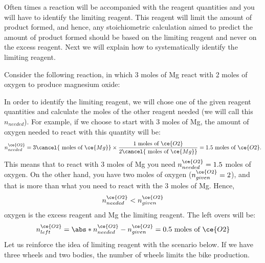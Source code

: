 \documentclass[main.tex]{subfiles}
\begin{document}
\begin{description}
Often times a reaction will be accompanied with the reagent quantities and you will have to identify the limiting reagent. This reagent will limit the amount of product formed, and hence, any stoichiometric calculation aimed to predict the amount of product formed should be based on the limiting reagent and never on the excess reagent.  Next we will explain how to systematically identify the limiting reagent.
\item[\docfilehook{Identifying the limiting reagent}{Identifying the limiting reagent}] 
Consider the following reaction, in which 3 moles of Mg react with 2 moles of oxygen to produce magnesium oxide:
\begin{center}  \end{center}
In order to identify the limiting reagent, we will chose one of the given reagent quantities and calculate the moles of the other reagent needed  (we will call this $n_{needed}$). For example, if we choose to start with 3 moles of Mg, the amount of oxygen needed to react with this quantity will be:
\begin{equation*}
n_{needed}^{\ce{O2}}=3\cancel{\text{ moles of }\ce{Mg}} \times \dfrac{\text{1 moles of }\ce{O2}}{2\cancel{\text{ moles of }\ce{Mg}}}=1.5\text{ moles of }\ce{O2}.
\end{equation*}
This means that to react with 3 moles of Mg you need $n_{needed}^{\ce{O2}}=1.5$ moles of oxygen. On the other hand, you have two moles of oxygen ($n_{given}^{\ce{O2}}=2$), and that is more than what you need to react with the 3 moles of Mg. Hence, 
\begin{equation*}
n_{needed}^{\ce{O2}}<n_{given}^{\ce{O2}}
\end{equation*}
oxygen is the excess reagent and Mg the limiting reagent. The left overs will be:
\begin{equation*}
n_{left}^{\ce{O2}}= \abs*{ n_{needed}^{\ce{O2}}-n_{given}^{\ce{O2}} }=0.5 \text{ moles of }\ce{O2}
\end{equation*}
Let us reinforce the idea of limiting reagent with the scenario below. If we have three  wheels and two bodies, the number of wheels limits the bike production. 
\begin{center}\vspace{1cm}\begin{tikzpicture}[x=1cm,y=1cm]

\end{tikzpicture}
\end{center}
\end{description}
\end{document}
